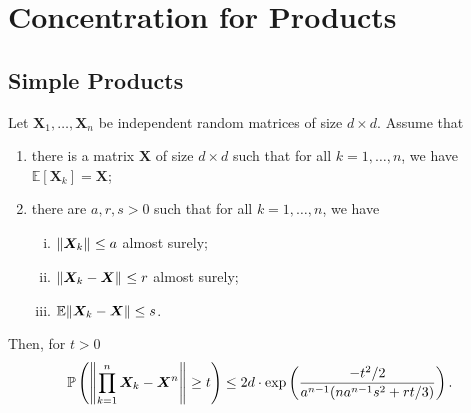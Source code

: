 \section{Concentration for Products}

\subsection{Simple Products}
\begin{thm}
  \label{prodconc}
    Let \( \bm{X}_1, \dots, \bm{X}_n \) be independent random matrices of size \( d \times d \). Assume that 
    \begin{enumerate}[1)]
      \item there is a matrix \( \bm{X} \) of size \( d\times d \) such that for all \( k=1, \dots, n \), we have \(\mathbb{E}\left[\bm{X}_k\right]=\bm{X}\);
      \item there are \( a,r,s >0 \) such that for all \( k=1,\dots, n \), we have 
        \begin{enumerate}[i)]
          \item \( \norm{\bm{X}_k}_{} \leq a \) almost surely;
          \item \( \norm{\bm{X}_k-\bm{X}}_{} \leq r\) almost surely;
          \item \( \mathbb{E}\norm{\bm{X}_k-\bm{X}} \leq s \).
        \end{enumerate}
            \end{enumerate}
    Then, for \( t >0 \)
    \[ \mathbb{P}\left(\norm{\prod_{k=1}^{n}\bm{X}_k- \bm{X}^{n}}_{} \geq t\right) \leq 2d \cdot \operatorname{exp}\left(\frac{-t^2/2}{a^{n-1}(na^{n-1}s^2+rt/3)}\right).
 \]
\end{thm}

